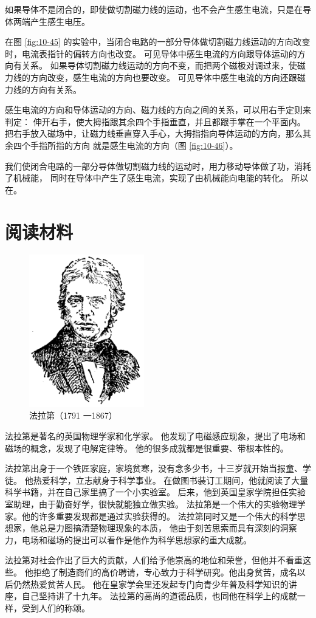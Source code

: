 如果导体不是闭合的，即使做切割磁力线的运动，也不会产生感生电流，只是在导体两端产生感生电压。

在图 \ref{fig:10-45} 的实验中，当闭合电路的一部分导体做切割磁力线运动的方向改变时，电流表指针的偏转方向也改变。
可见导体中感生电流的方向跟导体运动的方向有关系。
如果导体切割磁力线运动的方向不变，而把两个磁极对调过来，使磁力线的方向改变，感生电流的方向也要改变。
可见导体中感生电流的方向还跟磁力线的方向有关系。

感生电流的方向和导体运动的方向、磁力线的方向之间的关系，可以用右手定则来判定：
伸开右手，使大拇指跟其余四个手指垂直，并且都跟手掌在一个平面内。
把右手放入磁场中，让磁力线垂直穿入手心，大拇指指向导体运动的方向，那么其余四个手指所指的方向
就是感生电流的方向（图 \ref{fig:10-46}）。

我们使闭合电路的一部分导体做切割磁力线的运动时，用力移动导体做了功，消耗了机械能，
同时在导体中产生了感生电流，实现了由机械能向电能的转化。
所以在。



\section*{阅读材料}

\begin{figure}
    \centering
    \includegraphics[width=5cm]{../pic/czwl2-ch10-faraday}
    \caption*{法拉第（1791 一1867）}\label{fig:10-faraday}
\end{figure}

法拉第是著名的英国物理学家和化学家。
他发现了电磁感应现象，提出了电场和磁场的概念，发现了电解定律等。
他的很多成就都是很重要、带根本性的。

法拉第出身于一个铁匠家庭，家境贫寒，没有念多少书，十三岁就开始当报童、学徒。
他热爱科学，立志献身于科学事业。
在做图书装订工期间，他就阅读了大量科学书籍，并在自己家里搞了一个小实验室。
后来，他到英国皇家学院担任实验室助理，由于勤奋好学，很快就能独立做实验。
法拉第是一个伟大的实验物理学家。他的许多重要发现都是通过实验获得的。
法拉第同时又是一个伟大的科学思想家，他总是力图搞清楚物理现象的本质，
他由于刻苦思索而具有深刻的洞察力，电场和磁场的提出可以看作是他作为科学思想家的重大成就。

法拉第对社会作出了巨大的贡献，人们给予他崇高的地位和荣誉，但他并不看重这些。
他拒绝了制造商们的高价聘请，专心致力于科学研究。他出身贫苦，成名以后仍然热爱贫苦人民。
他在皇家学会里还发起专门向青少年普及科学知识的讲座，自己坚持讲了十九年。
法拉第的高尚的道德品质，也同他在科学上的成就一样，受到人们的称颂。

